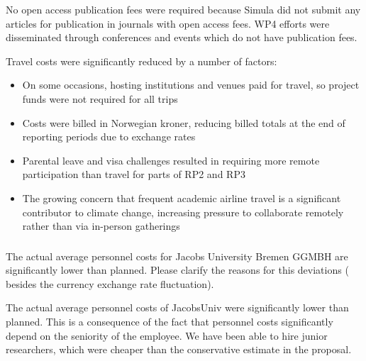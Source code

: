 No open access publication fees were required because Simula did not submit any articles for publication in journals with open access fees.
WP4 efforts were disseminated through conferences and events which do not have publication fees.

Travel costs were significantly reduced by a number of factors:
\begin{itemize}
  \item On some occasions, hosting institutions and venues paid for travel, so project funds were not required for all trips
  \item Costs were billed in Norwegian kroner, reducing billed totals at the end of reporting periods due to exchange rates
  \item Parental leave and visa challenges resulted in requiring more remote participation
    than travel for parts of RP2 and RP3
  \item The growing concern that frequent academic airline travel is a significant contributor to climate change,
    increasing pressure to collaborate remotely rather than via in-person gatherings
\end{itemize}





\subsubsection{}

\begin{EUcomment}
  The actual average personnel costs for Jacobs University Bremen GGMBH are significantly lower than planned. Please
  clarify the reasons for this deviations ( besides the currency exchange rate fluctuation).
\end{EUcomment}

The actual average personnel costs of JacobsUniv were significantly
lower than planned. This is a consequence of the fact that personnel
costs significantly depend on the seniority of the employee. We have
been able to hire junior researchers, which were cheaper than the
conservative estimate in the proposal.

\subsubsection{}

